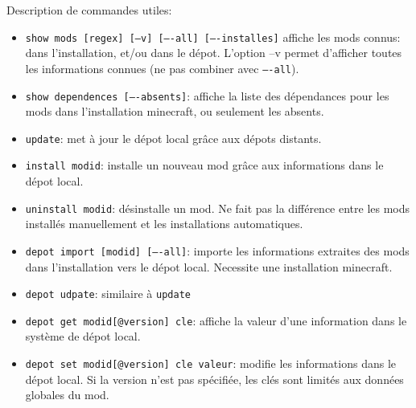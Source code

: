 \documentclass{article}
\begin{document}
\medskip
Description de commandes utiles:
\begin{itemize}
    \item \texttt{show mods [regex] [--v] [----all] [----installes]} affiche les mods connus: dans l'installation, et/ou dans le dépot.
L'option --v permet d'afficher toutes les informations connues (ne pas combiner avec \texttt{----all}).
    \item \texttt{show dependences [----absents]}: affiche la liste des dépendances pour les mods dans l'installation minecraft, ou seulement les absents.
    \item \texttt{update}: met à jour le dépot local grâce aux dépots distants.
    \item \texttt{install modid}: installe un nouveau mod grâce aux informations dans le dépot local.
    \item \texttt{uninstall modid}: désinstalle un mod. Ne fait pas la différence entre les mods installés manuellement et les installations automatiques.
    \item \texttt{depot import [modid] [----all]}: importe les informations extraites des mods dans l'installation vers le dépot local.
Necessite une installation minecraft.
    \item \texttt{depot udpate}: similaire à \texttt{update}
    \item \texttt{depot get modid[@version] cle}: affiche la valeur d'une information dans le système de dépot local.
    \item \texttt{depot set modid[@version] cle valeur}: modifie les informations dans le dépot local. Si la version n'est pas spécifiée, les clés sont limités aux données globales du mod.
\end{itemize}
\end{document}
